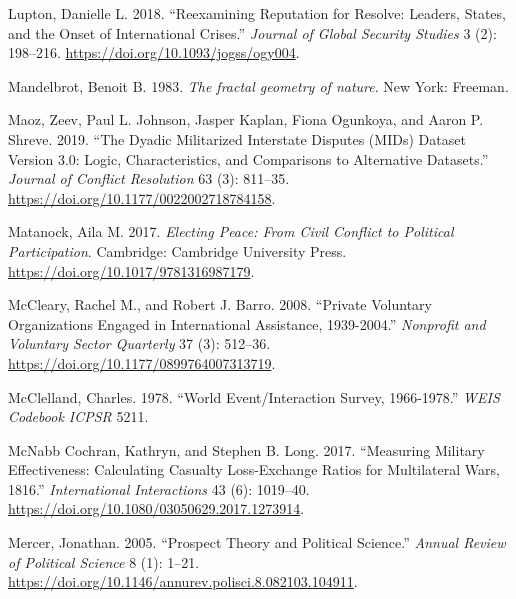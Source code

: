 \documentclass{article}
\newlength{\cslhangindent}
\newlength{\cslentryspacingunit} %
\newenvironment{CSLReferences}[2] %
 {%
  \setlength{\parindent}{0pt}
  \ifodd #1
  \let\oldpar\par
  \def\par{\hangindent=\cslhangindent\oldpar}
  \fi
  \setlength{\parskip}{#2\cslentryspacingunit}
 }%
 {}
\begin{document}
\begin{CSLReferences}{1}{0}
\leavevmode{}%
Lupton, Danielle L. 2018. {``Reexamining {Reputation} for {Resolve}:
{Leaders}, {States}, and the {Onset} of {International Crises}.''}
\emph{Journal of Global Security Studies} 3 (2): 198--216.
\url{https://doi.org/10.1093/jogss/ogy004}.

\leavevmode{}%
Mandelbrot, Benoit B. 1983. \emph{{The fractal geometry of nature}}.
{New York}: {Freeman}.

\leavevmode{}%
Maoz, Zeev, Paul L. Johnson, Jasper Kaplan, Fiona Ogunkoya, and Aaron P.
Shreve. 2019. {``The {Dyadic Militarized Interstate Disputes} ({MIDs})
{Dataset Version} 3.0: {Logic}, {Characteristics}, and {Comparisons} to
{Alternative Datasets}.''} \emph{Journal of Conflict Resolution} 63 (3):
811--35. \url{https://doi.org/10.1177/0022002718784158}.

\leavevmode{}%
Matanock, Aila M. 2017. \emph{Electing {Peace}: {From Civil Conflict} to
{Political Participation}}. {Cambridge}: {Cambridge University Press}.
\url{https://doi.org/10.1017/9781316987179}.

\leavevmode{}%
McCleary, Rachel M., and Robert J. Barro. 2008. {``Private {Voluntary
Organizations Engaged} in {International Assistance}, 1939-2004.''}
\emph{Nonprofit and Voluntary Sector Quarterly} 37 (3): 512--36.
\url{https://doi.org/10.1177/0899764007313719}.

\leavevmode{}%
McClelland, Charles. 1978. {``World Event/Interaction Survey,
1966-1978.''} \emph{WEIS Codebook ICPSR} 5211.

\leavevmode{}%
McNabb Cochran, Kathryn, and Stephen B. Long. 2017. {``Measuring
{Military Effectiveness}: {Calculating Casualty Loss-Exchange Ratios}
for {Multilateral Wars}, 1816.''} \emph{International
Interactions} 43 (6): 1019--40.
\url{https://doi.org/10.1080/03050629.2017.1273914}.

\leavevmode{}%
Mercer, Jonathan. 2005. {``Prospect {Theory} and {Political Science}.''}
\emph{Annual Review of Political Science} 8 (1): 1--21.
\url{https://doi.org/10.1146/annurev.polisci.8.082103.104911}.


\end{CSLReferences}
\end{document}
